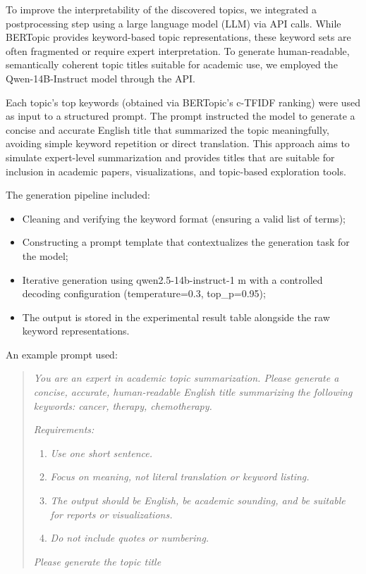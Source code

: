 \documentclass[authorproof,JACIII,researchpaper]{fujipressarticle}
\begin{document}
To improve the interpretability of the discovered topics, we integrated a postprocessing step using a large language model (LLM) via API calls. While BERTopic provides keyword-based topic representations, these keyword sets are often fragmented or require expert interpretation. To generate human-readable, semantically coherent topic titles suitable for academic use, we employed the Qwen-14B-Instruct model through the API.

Each topic's top keywords (obtained via BERTopic's c-TFIDF ranking) were used as input to a structured prompt. The prompt instructed the model to generate a concise and accurate English title that summarized the topic meaningfully, avoiding simple keyword repetition or direct translation. This approach aims to simulate expert-level summarization and provides titles that are suitable for inclusion in academic papers, visualizations, and topic-based exploration tools.

The generation pipeline included:

\begin{itemize}
    \item Cleaning and verifying the keyword format (ensuring a valid list of terms);
    \item Constructing a prompt template that contextualizes the generation task for the model;
    \item Iterative generation using qwen2.5-14b-instruct-1 m with a controlled decoding configuration (temperature=0.3, top\_p=0.95);
    \item The output is stored in the experimental result table alongside the raw keyword representations.
\end{itemize}

An example prompt used:

\begin{quote}
\textit{You are an expert in academic topic summarization. Please generate a concise, accurate, human-readable English title summarizing the following keywords: cancer, therapy, chemotherapy.}

\textit{Requirements:}
\begin{enumerate}
    \item \textit{Use one short sentence.}
    \item \textit{Focus on meaning, not literal translation or keyword listing.}
    \item \textit{The output should be English, be academic sounding, and be suitable for reports or visualizations.}
    \item \textit{Do not include quotes or numbering.}
\end{enumerate}

\textit{Please generate the topic title}
\end{quote}
\end{document}

